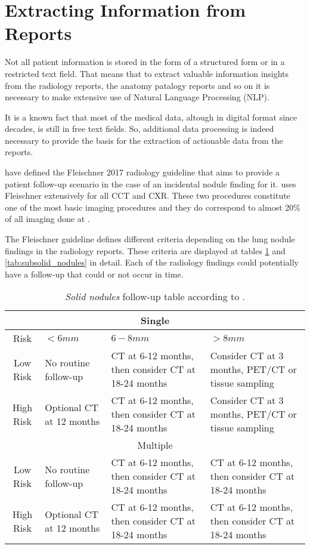 \section{Extracting Information from Reports}

Not all patient information is stored in the form of a structured form or in a restricted text field. That means that to extract valuable information insights from the radiology reports, the anatomy patalogy reports and so on it is necessary to make extensive use of Natural Language Processing (NLP). %

It is a known  fact that most of the medical data, altough in digital format since decades, is still in free text fields. %
So, additional data processing is indeed necessary to provide the basis for the extraction of actionable data from the reports.

 have defined the Fleischner 2017 radiology guideline that aims to provide a patient follow-up scenario in the case of an incidental nodule finding for it. \nomeHsl{} uses Fleischner extensively for all CCT and CXR. These two procedures constitute one of the most basic imaging procedures and they do correspond to almost 20\% of all imaging done at \nomeHslShort{}. %

The Fleischner guideline defines different criteria depending on the lung nodule findings in the radiology reports. These criteria are displayed at tables \ref{tab:solid_nodules} and \ref{tab:subsolid_nodules} in detail. Each of the radiology findings could potentially have a follow-up that could or not occur in time.

\begin{center}
\begin{table}
\begin{centering}
\begin{tabular}{c|>{\centering}p{}|>{\centering}p{}|>{\centering}p{}}
\hline 
\multicolumn{4}{c}{Single}\tabularnewline
\hline 
Risk & $<6mm$ & $6-8mm$ & $>8mm$\tabularnewline
\hline 
Low Risk & No routine follow-up & CT at 6-12 months, then consider CT at 18-24 months & Consider CT at 3 months, PET/CT or tissue sampling\tabularnewline
High Risk & Optional CT at 12 months & CT at 6-12 months, then consider CT at 18-24 months & Consider CT at 3 months, PET/CT or tissue sampling\tabularnewline
\hline 
\multicolumn{4}{c}{Multiple}\tabularnewline
\hline 
Low Risk & No routine follow-up & CT at 6-12 months, then consider CT at 18-24 months & CT at 6-12 months, then consider CT at 18-24 months\tabularnewline
High Risk & Optional CT at 12 months & CT at 6-12 months, then consider CT at 18-24 months & CT at 6-12 months, then consider CT at 18-24 months\tabularnewline
\hline 
\end{tabular}
\par\end{centering}
\caption{\label{tab:solid_nodules} \emph{Solid nodules} follow-up table according to .}
\end{table}
\vspace*{-44pt}
\par\end{center}

